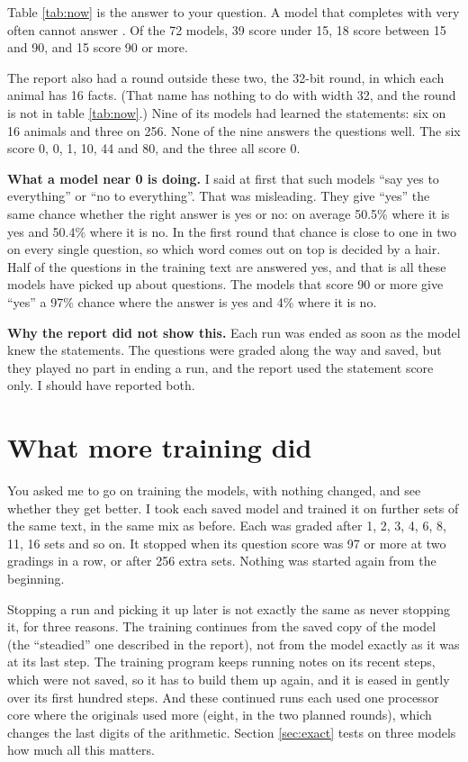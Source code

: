 Table \ref{tab:now} is the answer to your question. A model that completes  with
 very often cannot answer . Of the 72 models, 39 score under 15,
18 score between 15 and 90, and 15 score 90 or more.

The report also had a round outside these two, the 32-bit round, in which each animal has 16
facts. (That name has nothing to do with width 32, and the round is not in table
\ref{tab:now}.) Nine of its models had learned the statements: six on 16 animals and three on
256. None of the nine answers the questions well. The six score 0, 0, 1, 10, 44 and 80, and the
three all score 0.

\textbf{What a model near 0 is doing.} I said at first that such models ``say yes to
everything'' or ``no to everything''. That was misleading. They give ``yes'' the same chance
whether the right answer is yes or no: on average 50.5\% where it is yes and 50.4\% where it
is no. In the first round that chance is close to one in two on every single question, so
which word comes out on top is decided by a hair. Half of the questions in the training text
are answered yes, and that is all these models have picked up about questions. The models that
score 90 or more give ``yes'' a 97\% chance where the answer is yes and 4\% where it is no.

\textbf{Why the report did not show this.} Each run was ended as soon as the model knew the
statements. The questions were graded along the way and saved, but they played no part in
ending a run, and the report used the statement score only. I should have reported both.

\section{What more training did}

You asked me to go on training the models, with nothing changed, and see whether they get
better. I took each saved model and trained it on further sets of the same text, in the same
mix as before. Each was graded after 1, 2, 3, 4, 6, 8, 11, 16 sets and so on. It stopped when
its question score was 97 or more at two gradings in a row, or after 256 extra sets. Nothing
was started again from the beginning.

Stopping a run and picking it up later is not exactly the same as never stopping it, for
three reasons. The training continues from the saved copy of the model (the ``steadied'' one
described in the report), not from the model exactly as it was at its last step. The training
program keeps running notes on its recent steps, which were not saved, so it has to build them
up again, and it is eased in gently over its first hundred steps. And these continued runs
each used one processor core where the originals used more (eight, in the two planned rounds),
which changes the last digits of the arithmetic. Section \ref{sec:exact} tests on three models how much all this matters.

